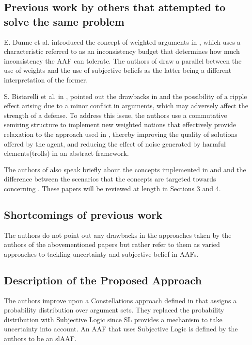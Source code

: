 \documentclass[UTF8]{article}
\begin{document}
\subsection{Previous work by others that attempted to solve the same problem}
E. Dunne et al. introduced the concept of weighted arguments in \cite{DUNNE2011457}, which uses a characteristic referred to as an inconsistency budget
that determines how much inconsistency the AAF can tolerate. The authors of \cite{8455455} draw a parallel between the use of weights and the use of subjective beliefs as the latter being a different interpretation of the former.

S. Bistarelli et al. in \cite{Bistarelli}, pointed out the drawbacks in \cite{DUNNE2011457} and the possibility of a ripple effect arising due to a minor conflict in arguments, which may adversely affect the
strength of a defense. To address this issue, the authors use a commutative semiring structure to implement new weighted notions that effectively provide relaxation to the approach used in \cite{DUNNE2011457}, 
thereby improving the quality of solutions offered by the agent, and reducing the effect of noise generated by harmful elements(trolls) in an abstract framework.

The authors of \cite{8455455} also speak briefly about the concepts implemented in \cite{Koster2017} and \cite{OREN2007838} and the difference between the scenarios that the concepts are targeted towards concerning \cite{8455455}. 
These papers will be reviewed at length in Sections 3 and 4.

\subsection{Shortcomings of previous work}
The authors do not point out any drawbacks in the approaches taken by the authors of the abovementioned papers but rather refer to them as varied approaches to tackling uncertainty and subjective belief in AAFs.

\subsection{Description of the Proposed Approach}
The authors improve upon a Constellations approach defined in \cite{dung2010towards} that assigns a probability distribution 
over argument sets. 
They replaced the probability distribution with Subjective Logic since SL provides a mechanism to take uncertainty into account. An AAF that
uses Subjective Logic is defined by the authors to be an slAAF. 
\end{document}
